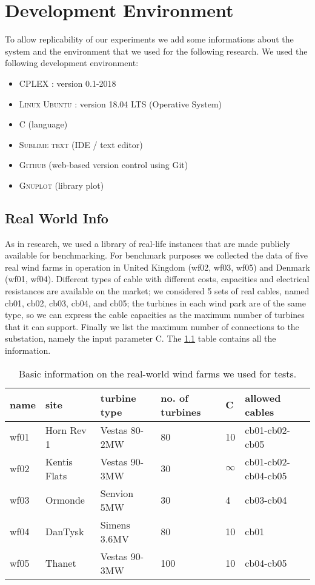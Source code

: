 
\chapter{Development Environment}
\label{chp:1-Environment}
To allow replicability of our experiments we add some informations about the system and the environment that we used for the following research. 
We used the following development environment:
\begin{itemize}
\item \textsc{CPLEX} :  version 0.1-2018
\item \textsc{Linux Ubuntu} : version 18.04 LTS (Operative System)
\item \textsc{C}  	(language)
\item \textsc{Sublime text} (IDE / text editor)
\item \textsc{Github} (web-based version control using Git)
\item \textsc{Gnuplot} (library plot)
\end{itemize}

\section{Real World Info}
As in \cite{wfcp} research, we used a library of real-life instances that are made publicly available for benchmarking.
For benchmark purposes we collected the data of five real wind farms in operation in United Kingdom (wf02, wf03, wf05) and Denmark (wf01, wf04). Different types of cable with different costs, capacities and electrical resistances are available on the market; we considered 5 sets of real cables, named cb01, cb02, cb03, cb04, and cb05; the turbines in each wind park are of the same type, so we can express the cable capacities as the maximum number of turbines that it can support. Finally we list the maximum number of connections to the substation, namely the input parameter C. The \ref{tab:realWorld} table contains all the information.
\begin{table}[!htbp]\label{tab:realWorld}
\center
\begin{tabular}{llllll}
\hline
name & site         & turbine type  & no. of turbines & C  & allowed cables      \\ \hline
wf01 & Horn Rev 1   & Vestas 80-2MW & 80              & 10 & cb01-cb02-cb05      \\
wf02 & Kentis Flats & Vestas 90-3MW & 30              & $\infty$   & cb01-cb02-cb04-cb05 \\
wf03 & Ormonde      & Senvion 5MW   & 30              & 4  & cb03-cb04           \\
wf04 & DanTysk      & Simens 3.6MV  & 80              & 10 & cb01                \\
wf05 & Thanet       & Vestas 90-3MW & 100             & 10 & cb04-cb05           \\ \hline
\end{tabular}
\caption{Basic information on the real-world wind farms we used for tests.}
\end{table}

